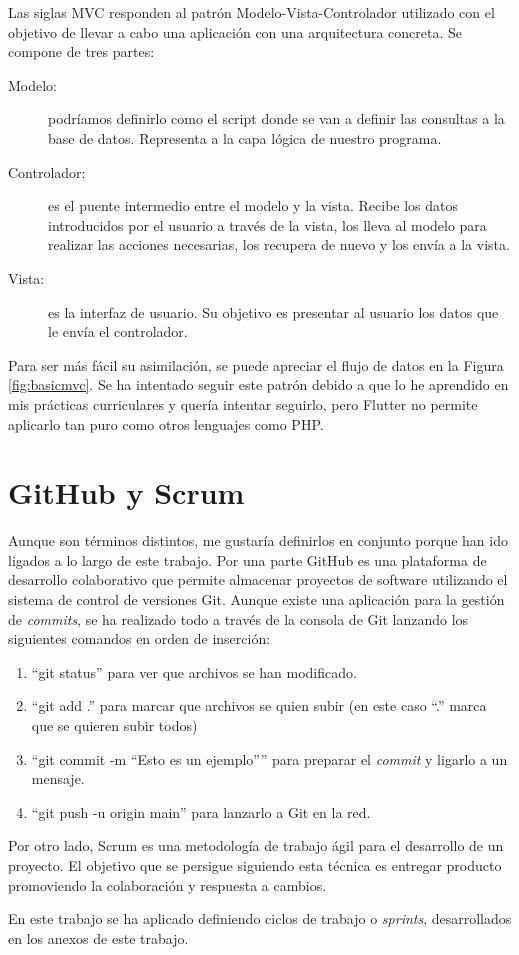 	Las siglas MVC responden al patrón Modelo-Vista-Controlador utilizado con el objetivo de llevar a cabo una aplicación con una arquitectura concreta. Se compone de tres partes:
	\begin{description}
		\item [Modelo:] podríamos definirlo como el script donde se van a definir las consultas a la base de datos. Representa a la capa lógica de nuestro programa.
		\item [Controlador:] es el puente intermedio entre el modelo y la vista. Recibe los datos introducidos por el usuario a través de la vista, los lleva al modelo para realizar las acciones necesarias, los recupera de nuevo y los envía a la vista.
		\item [Vista:] es la interfaz de usuario. Su objetivo es presentar al usuario los datos que le envía el controlador.
	\end{description}
	
	Para ser más fácil su asimilación, se puede apreciar el flujo de datos en la Figura \ref{fig:basicmvc}. Se ha intentado seguir este patrón debido a que lo he aprendido en mis prácticas curriculares y quería intentar seguirlo, pero Flutter no permite aplicarlo tan puro como otros lenguajes como PHP.
	

\section{GitHub y Scrum}

	Aunque son términos distintos, me gustaría definirlos en conjunto porque han ido ligados a lo largo de este trabajo. Por una parte GitHub es una plataforma de desarrollo colaborativo que permite almacenar proyectos de software utilizando el sistema de control de versiones Git. Aunque existe una aplicación para la gestión de \emph{commits}, se ha realizado todo a través de la consola de Git lanzando los siguientes comandos en orden de inserción:
	\begin{enumerate}
		\item ``git status'' para ver que archivos se han modificado.
		\item ``git add .'' para marcar que archivos se quien subir (en este caso ``.'' marca que se quieren subir todos)
		\item ``git commit -m ``Esto es un ejemplo'''' para preparar el \emph{commit} y ligarlo a un mensaje.
		\item ``git push -u origin main'' para lanzarlo a Git en la red.
	\end{enumerate}
	
	Por otro lado, Scrum es una metodología de trabajo ágil para el desarrollo de un proyecto. El objetivo que se persigue siguiendo esta técnica es entregar producto promoviendo la colaboración y respuesta a cambios.
	
	En este trabajo se ha aplicado definiendo ciclos de trabajo o \emph{sprints}, desarrollados en los anexos de este trabajo.
